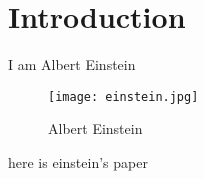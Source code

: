 \section{Introduction}

I am Albert Einstein

\begin{figure}[h!]
    \centering
    \texttt{[image: einstein.jpg]}
    \caption{Albert Einstein}
    \label{fig:einstein}
\end{figure}

here is einstein's paper \cite{Einstein1935}